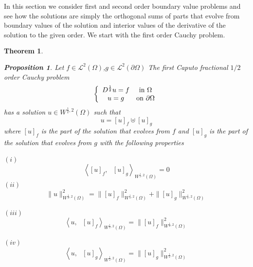 \documentclass{amsart}%
\newtheorem{theorem}{Theorem}
\theoremstyle{plain}
\newtheorem{proposition}{Proposition}
\numberwithin{equation}{section}
\begin{document}
In this section we consider first and second order boundary value problems and
see how the solutions are simply the orthogonal sums of parts that evolve from
boundary values of the solution and interior values of the derivative of the
solution to the given order. We start with the first order Cauchy problem.

\begin{theorem}
\begin{proposition}
Let $f\in%
\mathcal{L}%
^{2}\left(  \Omega\right)  $,$g\in%
\mathcal{L}%
^{2}\left(  \partial\Omega\right)  $ The first Caputo fractional $1/2$ order
Cauchy problem%
\begin{equation}
\left\{
\begin{array}
[c]{cc}%
D^{\frac{1}{2}}u=f & \text{in }\Omega\\
u=g & \text{on }\partial\Omega
\end{array}
\right.
\end{equation}
has a solution $u\in W^{\frac{1}{2},2}\left(  \Omega\right)  $ such that
\[
u=\left[  u\right]  _{f}\uplus\left[  u\right]  _{g}%
\]
where $\left[  u\right]  _{f}$ is the part of the solution that evolves from
$f $ and $\left[  u\right]  _{g}$ is the part of the solution that evolves
from $g $ with the following properties

$(i)$
\[
\left\langle \left[  u\right]  _{f},\text{ }\left[  u\right]  _{g}%
\right\rangle _{W^{\frac{1}{2},2}\left(  \Omega\right)  }=0
\]
$\left(  ii\right)  $%
\[
\parallel u\parallel_{W^{\frac{1}{2},2}\left(  \Omega\right)  }^{2}%
=\parallel\left[  u\right]  _{f}\parallel_{W^{\frac{1}{2},2}\left(
\Omega\right)  }^{2}+\parallel\left[  u\right]  _{g}\parallel_{W^{\frac{1}%
{2},2}\left(  \Omega\right)  }^{2}%
\]

\end{proposition}

$\left(  iii\right)  $
\[
\left\langle u,\text{ }\left[  u\right]  _{f}\right\rangle _{W^{\frac{1}{2}%
,2}\left(  \Omega\right)  }=\parallel\left[  u\right]  _{f}\parallel
_{W^{\frac{1}{2},2}\left(  \Omega\right)  }^{2}%
\]


$\left(  iv\right)  $
\[
\left\langle u,\text{ }\left[  u\right]  _{g}\right\rangle _{W^{\frac{1}{2}%
,2}\left(  \Omega\right)  }=\parallel\left[  u\right]  _{g}\parallel
_{W^{\frac{1}{2},2}\left(  \Omega\right)  }^{2}%
\]

\end{theorem}
\end{document}
